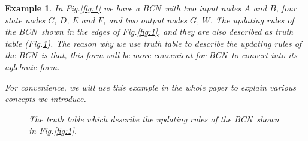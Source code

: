 \documentclass[conference]{IEEEtran} %
\newtheorem{example}{Example}
\def \BCN {{\em BCN}}
\begin{document}
\begin{example}
	In {\em  Fig.\ref{fig:1}} we have a \BCN\ with two input nodes $A$ and $B$, four state nodes $C$, $D$, $E$ and $F$, and two output nodes $G$, $W$. The updating rules of the \BCN\ shown in the edges of {\em Fig.\ref{fig:1}}, and they are also described as truth table ({\em Fig.\ref{fig:2}}). The reason why we use truth table to describe the updating rules of the \BCN\ is that,  this form will be more convenient for \BCN\ to convert into its aglebraic form.
	
	For convenience, we will use this example in the whole paper to explain various concepts we introduce.
  \begin{figure}[thpb]
      \centering
      
      \caption{The truth table which describe the updating rules of the \BCN\ shown in {\em Fig.\ref{fig:1}}.}
      \label{fig:2}
   \end{figure}
\end{example}   


\end{document}
